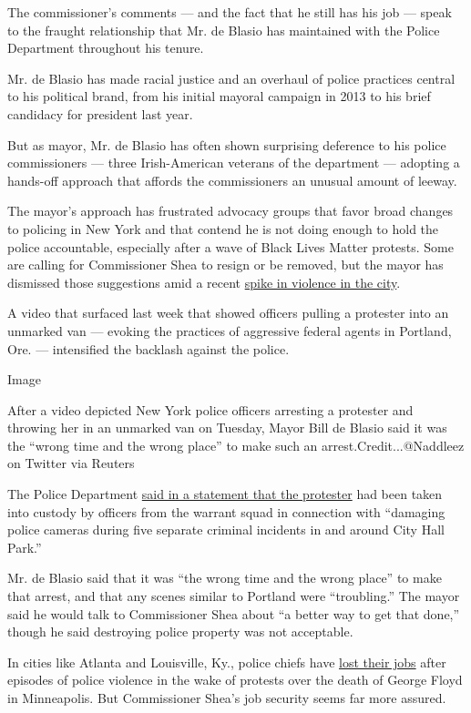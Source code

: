The commissioner's comments --- and the fact that he still has his job
--- speak to the fraught relationship that Mr. de Blasio has maintained
with the Police Department throughout his tenure.

Mr. de Blasio has made racial justice and an overhaul of police
practices central to his political brand, from his initial mayoral
campaign in 2013 to his brief candidacy for president last year.

But as mayor, Mr. de Blasio has often shown surprising deference to his
police commissioners --- three Irish-American veterans of the department
--- adopting a hands-off approach that affords the commissioners an
unusual amount of leeway.

The mayor's approach has frustrated advocacy groups that favor broad
changes to policing in New York and that contend he is not doing enough
to hold the police accountable, especially after a wave of Black Lives
Matter protests. Some are calling for Commissioner Shea to resign or be
removed, but the mayor has dismissed those suggestions amid a recent
\href{https://www.nytimes.com/2020/07/16/nyregion/nyc-shootings-nypd.html}{spike
in violence in the city}.

A video that surfaced last week that showed officers pulling a protester
into an unmarked van --- evoking the practices of aggressive federal
agents in Portland, Ore. --- intensified the backlash against the
police.

Image

After a video depicted New York police officers arresting a protester
and throwing her in an unmarked van on Tuesday, Mayor Bill de Blasio
said it was the ``wrong time and the wrong place'' to make such an
arrest.Credit...@Naddleez on Twitter via Reuters

The Police Department
\href{https://twitter.com/NYPDnews/status/1288270680614739968}{said in a
statement that the protester} had been taken into custody by officers
from the warrant squad in connection with ``damaging police cameras
during five separate criminal incidents in and around City Hall Park.''

Mr. de Blasio said that it was ``the wrong time and the wrong place'' to
make that arrest, and that any scenes similar to Portland were
``troubling.'' The mayor said he would talk to Commissioner Shea about
``a better way to get that done,'' though he said destroying police
property was not acceptable.

In cities like Atlanta and Louisville, Ky., police chiefs have
\href{https://www.nytimes.com/2020/06/15/us/police-chiefs-fatal-shooting-atlanta.html}{lost
their jobs} after episodes of police violence in the wake of protests
over the death of George Floyd in Minneapolis. But Commissioner Shea's
job security seems far more assured.

